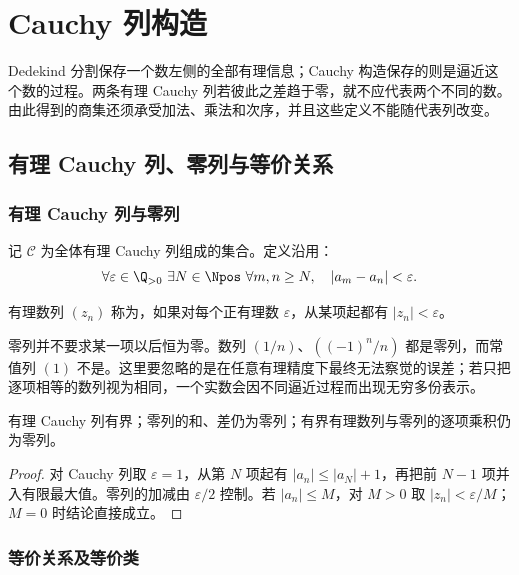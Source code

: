 \chapter{Cauchy 列构造}
\label{chap:cauchy-construction}

Dedekind 分割保存一个数左侧的全部有理信息；Cauchy 构造保存的则是逼近这个数的过程。两条有理 Cauchy 列若彼此之差趋于零，就不应代表两个不同的数。由此得到的商集还须承受加法、乘法和次序，并且这些定义不能随代表列改变。

\section{有理 Cauchy 列、零列与等价关系}

\subsection{有理 Cauchy 列与零列}


记 \(\mathcal C\) 为全体有理 Cauchy 列组成的集合。定义沿用：
\[
\forall\varepsilon\in\Q_{>0}\ \exists N\in\Npos\
 \forall m,n\ge N,\quad |a_m-a_n|<\varepsilon.
\]

\begin{definition}
有理数列 \((z_n)\) 称为，如果对每个正有理数 \(\varepsilon\)，从某项起都有 \(|z_n|<\varepsilon\)。
\end{definition}

零列并不要求某一项以后恒为零。数列 \((1/n)\)、\(((-1)^n/n)\) 都是零列，而常值列 \((1)\) 不是。这里要忽略的是在任意有理精度下最终无法察觉的误差；若只把逐项相等的数列视为相同，一个实数会因不同逼近过程而出现无穷多份表示。

\begin{proposition}
有理 Cauchy 列有界；零列的和、差仍为零列；有界有理数列与零列的逐项乘积仍为零列。
\end{proposition}

\begin{proof}
对 Cauchy 列取 \(\varepsilon=1\)，从第 \(N\) 项起有 \(|a_n|\le|a_N|+1\)，再把前 \(N-1\) 项并入有限最大值。零列的加减由 \(\varepsilon/2\) 控制。若 \(|a_n|\le M\)，对 \(M>0\) 取 \(|z_n|<\varepsilon/M\)；\(M=0\) 时结论直接成立。
\end{proof}

\subsection{等价关系及等价类}


